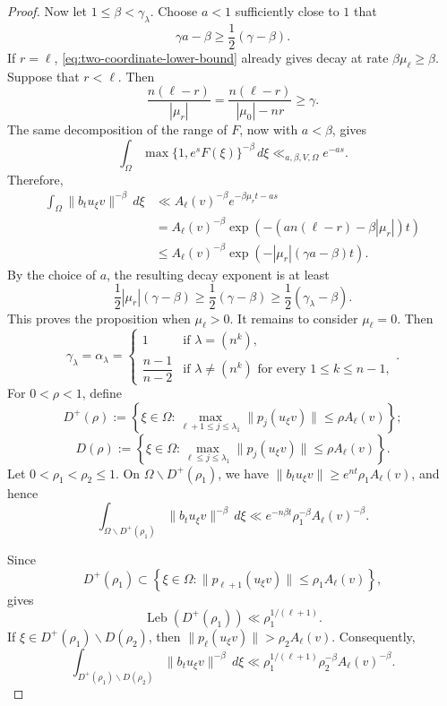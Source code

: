 \documentclass[reqno,11pt]{amsart}
\numberwithin{equation}{section}
\theoremstyle{definition}
\theoremstyle{remark}
\newcommand{\op}{\operatorname}
\newcommand{\Leb}{\op{Leb}}
\begin{document}
\begin{proof}
Now let $1\le\beta<\gamma_\lambda$. Choose $a<1$ sufficiently close
to $1$ that
$$
\gamma a-\beta\ge\frac12(\gamma-\beta).
$$
If $r=\ell$, \eqref{eq:two-coordinate-lower-bound} already gives decay
at rate $\beta\mu_\ell\ge\beta$. Suppose that $r<\ell$. Then
$$
\frac{n(\ell-r)}{|\mu_r|}
=
\frac{n(\ell-r)}{|\mu_0|-nr}
\ge\gamma.
$$
The same decomposition of the range of $F$, now with $a<\beta$, gives
$$
\int_\Omega\max\{1,e^sF(\xi)\}^{-\beta}\,d\xi
\ll_{a,\beta,V,\Omega}e^{-as}.
$$
Therefore,
$$
\begin{aligned}
\int_\Omega\|b_tu_\xi v\|^{-\beta}\,d\xi
&\ll
A_\ell(v)^{-\beta}e^{-\beta\mu_rt-as}\\
&=
A_\ell(v)^{-\beta}
\exp\left(
-\left(an(\ell-r)-\beta|\mu_r|\right)t
\right)\\
&\le
A_\ell(v)^{-\beta}
\exp\left(
-|\mu_r|(\gamma a-\beta)t
\right).
\end{aligned}
$$
By the choice of $a$, the resulting decay exponent is at least
$$
\frac12|\mu_r|(\gamma-\beta)
\ge\frac12(\gamma-\beta)
\ge\frac12(\gamma_\lambda-\beta).
$$
This proves the proposition when $\mu_\ell>0$.
It remains to consider $\mu_\ell=0$. Then
$$
\gamma_{\lambda}=\alpha_\lambda=
\begin{cases}
1&\text{if }\lambda=(n^k),\\
\dfrac{n-1}{n-2}
&\text{if }\lambda\ne(n^k)\text{ for every }1\le k\le n-1,
\end{cases}.
$$
 For $0<\rho<1$, define
$$
D^+(\rho):=
\left\{\xi\in\Omega:
\max_{\ell+1\le j\le\lambda_1}
\|p_j(u_\xi v)\|\le\rho A_\ell(v)
\right\};
$$
$$
D(\rho):=
\left\{\xi\in\Omega:
\max_{\ell\le j\le\lambda_1}
\|p_j(u_\xi v)\|\le\rho A_\ell(v)
\right\}.
$$
Let $0<\rho_1<\rho_2\le1$. On
$\Omega\smallsetminus D^+(\rho_1)$,
we have
$\|b_tu_\xi v\|\ge e^{nt}\rho_1A_\ell(v)$,
and hence
\begin{equation}
\label{eq:borderline-contribution-one}
\int_{\Omega\smallsetminus D^+(\rho_1)}
\|b_tu_\xi v\|^{-\beta}\,d\xi
\ll e^{-n\beta t}\rho_1^{-\beta}A_\ell(v)^{-\beta}.
\end{equation}

Since
$$
D^+(\rho_1)
\subset
\left\{\xi\in\Omega:
\|p_{\ell+1}(u_\xi v)\|\le\rho_1A_\ell(v)
\right\},
$$
 gives
$$
\Leb(D^+(\rho_1))
\ll\rho_1^{1/(\ell+1)}.
$$
If $\xi\in D^+(\rho_1)\smallsetminus D(\rho_2)$, then
$\|p_\ell(u_\xi v)\|>\rho_2A_\ell(v)$. Consequently,
\begin{equation}
\label{eq:borderline-contribution-two}
\int_{D^+(\rho_1)\smallsetminus D(\rho_2)}
\|b_tu_\xi v\|^{-\beta}\,d\xi
\ll
\rho_1^{1/(\ell+1)}
\rho_2^{-\beta}A_\ell(v)^{-\beta}.
\end{equation}


\end{proof}
\end{document}
